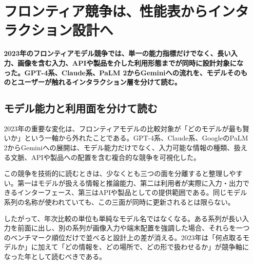 \section{フロンティア競争は、性能表からインタラクション設計へ}
\label{pkg:frontier-interface}
\noindent\textbf{2023年のフロンティアモデル競争では、単一の能力指標だけでなく、長い入力、画像を含む入力、APIや製品を介した利用形態までが同時に設計対象になった。GPT-4系、Claude系、PaLM 2からGeminiへの流れを、モデルそのものとユーザーが触れるインタラクション層を分けて読む。}\autocite{src-013fa77665db,src-2b6af707f3ef,src-3375c5d27d9b,src-39071a9443e5,src-5bfa9c93d034,src-93d355bf8806,src-a3dead6cff65,src-a95452783369,src-b1525886b462,src-db671ee1d1b8,src-e116708067ab,src-f5041642fb21,src-f951bda6a0f4,src-fd9cb9c0061f}

\subsection{モデル能力と利用面を分けて読む}

2023年の重要な変化は、フロンティアモデルの比較対象が「どのモデルが最も賢いか」という一軸から外れたことである。GPT-4系、Claude系、GoogleのPaLM 2からGeminiへの展開は、モデル能力だけでなく、入力可能な情報の種類、扱える文脈、APIや製品への配置を含む複合的な競争を可視化した。\autocite{src-013fa77665db,src-3375c5d27d9b,src-39071a9443e5,src-5bfa9c93d034,src-93d355bf8806,src-a3dead6cff65,src-a95452783369,src-b1525886b462,src-db671ee1d1b8,src-f5041642fb21,src-f951bda6a0f4,src-fd9cb9c0061f}


この競争を技術的に読むときは、少なくとも三つの面を分離すると整理しやすい。第一はモデルが扱える情報と推論能力、第二は利用者が実際に入力・出力できるインターフェース、第三はAPIや製品としての提供範囲である。同じモデル系列の名称が使われていても、この三面が同時に更新されるとは限らない。\autocite{src-013fa77665db,src-3375c5d27d9b,src-39071a9443e5,src-5bfa9c93d034,src-93d355bf8806,src-a3dead6cff65,src-a95452783369,src-b1525886b462,src-db671ee1d1b8,src-f5041642fb21,src-f951bda6a0f4,src-fd9cb9c0061f}


したがって、年次比較の単位も単純なモデル名ではなくなる。ある系列が長い入力を前面に出し、別の系列が画像入力や端末配置を強調した場合、それらを一つのベンチマーク順位だけで並べると設計上の差が消える。2023年は「何点取るモデルか」に加えて「どの情報を、どの場所で、どの形で扱わせるか」が競争軸になった年として読むべきである。\autocite{src-3375c5d27d9b,src-5bfa9c93d034,src-93d355bf8806,src-a3dead6cff65,src-a95452783369,src-db671ee1d1b8,src-e116708067ab,src-f951bda6a0f4,src-fd9cb9c0061f}


